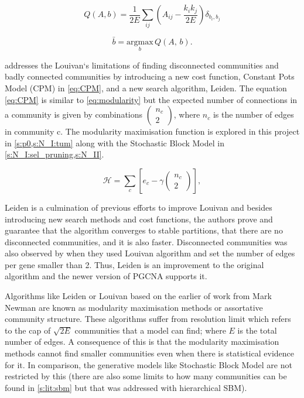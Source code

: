 \begin{equation} \label{eq:mod_max_cost}
    Q(A,b) = \frac{1}{2E} \sum_{ij} \left( A_{ij} - \frac{k_i k_j}{2E} \right) \delta_{b_i, b_j}
\end{equation}

\begin{equation} \label{eq:mod_max_per_com}
    \bar{b} = \underset{b}{\mathrm{argmax}} \, Q(A, \, b).
\end{equation}

\citet{Traag2019-ne} addresses the Louivan`s limitations of finding disconnected communities and badly connected communities by introducing a new cost function, Constant Pots Model (CPM) in \cref{eq:CPM}, and a new search algorithm, Leiden. The equation \cref{eq:CPM} is similar to \cref{eq:modularity} but the expected number of connections in a community is given by combinations $(\begin{array}{c}{n}_{c}\\ 2\end{array})$, where $n_c$ is the number of edges in community c. The modularity maximisation function is explored in this project in \cref{s:p0,s:N_I:tum} along with the Stochastic Block Model in \cref{s:N_I:sel_pruning,s:N_II}.

\begin{equation} \label{eq:CPM}
    {\mathcal H} ={\sum }_{c}[{e}_{c}-\gamma (\begin{array}{c}{n}_{c}\\ 2\end{array})],
\end{equation}

Leiden is a culmination of previous efforts to improve Louivan \citep{Ozaki2016-dl, Waltman2013-zw, Bae2017-rz, Traag2015-tq} and besides introducing new search methods and cost functions, the authors prove and guarantee that the algorithm converges to stable partitions, that there are no disconnected communities, and it is also faster. Disconnected communities was also observed by \citet{Care2019-ij} when they used Louivan algorithm and set the number of edges per gene smaller than 2. Thus, Leiden is an improvement to the original algorithm and the newer version of PGCNA \citep{Care2019-ij} supports it.

Algorithms like Leiden or Louivan based on the earlier of work from Mark Newman \citep{Newman2004-dd, Newman2006-fa} are known as modularity maximisation methods or assortative community structure. These algorithms suffer from resolution limit \citep{Fortunato2007-gh, Peixoto2021-jx} which refers to the cap of $\sqrt{2E}$ communities that a model can find; where $E$ is the total number of edges. A consequence of this is that the modularity maximisation methods cannot find smaller communities even when there is statistical evidence for it. In comparison, the generative models like Stochastic Block Model are not restricted by this (there are also some limits to how many communities can be found in \cref{s:lit:sbm} but that was addressed with hierarchical SBM).

